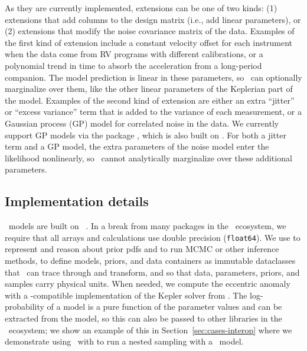 \documentclass[twocolumn]{AASTeX7/aastex701}
\newcommand{\harv}{\package{harv}}
\begin{document}
As they are currently implemented, extensions can be one of two kinds: (1) extensions
that add columns to the design matrix (i.e., add linear parameters), or (2) extensions
that modify the noise covariance matrix of the data.
Examples of the first kind of extension include a constant velocity offset for each
instrument when the data come from RV programs with different calibrations, or a
polynomial trend in time to absorb the acceleration from a long-period companion.
The model prediction is linear in these parameters, so \harv\ can optionally marginalize
over them, like the other linear parameters of the Keplerian part of the model.
Examples of the second kind of extension are either an extra ``jitter'' or ``excess
variance'' term that is added to the variance of each measurement, or a Gaussian process
(GP) model for correlated noise in the data.
We currently support GP models via the  package
\citep{Foreman-Mackey:2026}, which is also built on \jax.
For both a jitter term and a GP model, the extra parameters of the noise model enter the
likelihood nonlinearly, so \harv\ cannot analytically marginalize over these additional
parameters.


\subsection{Implementation details}
\label{sec:design-implementation}

\harv\ models are built on \jax\ \citep{Bradbury:2018}.
In a break from many packages in the \jax\ ecosystem, we require that all arrays and
calculations use double precision (\texttt{float64}).
We use  \citep{phan2019composable} to represent and reason about prior
pdfs and to run MCMC or other inference methods,  \citep{Kidger:2021}
to define models, priors, and data containers as immutable dataclasses that \jax\ can
trace through and transform, and  \citep{Starkman:2025} so that data,
parameters, priors, and samples carry physical units.
When needed, we compute the eccentric anomaly with a \jax-compatible implementation of
the Kepler solver from  \citep{Brandt:2021, Raposo-Pulido:2017}.
The log-probability of a model is a pure function of the parameter values and can be
extracted from the  model, so this can also be passed to other
libraries in the \jax\ ecosystem; we show an example of this in
Section~\ref{sec:cases-interop} where we demonstrate using \harv\ with
 \citep{Cabezas:2024} to run a nested sampling with a \harv\ model.
\end{document}
